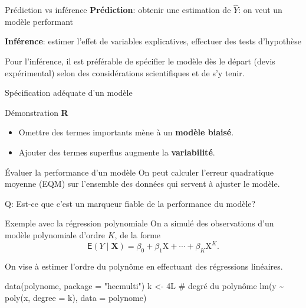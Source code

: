 \documentclass[
  ignorenonframetext,
]{beamer}
\newenvironment{Shaded}{\begin{snugshade}}{\end{snugshade}}
\newcommand{\AttributeTok}[1]{\textcolor[rgb]{0.40,0.45,0.13}{#1}}
\newcommand{\CommentTok}[1]{\textcolor[rgb]{0.37,0.37,0.37}{#1}}
\newcommand{\FunctionTok}[1]{\textcolor[rgb]{0.28,0.35,0.67}{#1}}
\newcommand{\NormalTok}[1]{\textcolor[rgb]{0.00,0.23,0.31}{#1}}
\newcommand{\OtherTok}[1]{\textcolor[rgb]{0.00,0.23,0.31}{#1}}
\newcommand{\SpecialCharTok}[1]{\textcolor[rgb]{0.37,0.37,0.37}{#1}}
\newcommand{\StringTok}[1]{\textcolor[rgb]{0.13,0.47,0.30}{#1}}
\providecommand{\tightlist}{%
  \setlength{\itemsep}{0pt}\setlength{\parskip}{0pt}}\usepackage{longtable,booktabs,array}
\begin{document}
\begin{frame}{Prédiction vs inférence}
\protect\hypertarget{pruxe9diction-vs-infuxe9rence}{}
\textbf{Prédiction}: obtenir une estimation de \(\widehat{Y}\): on veut
un modèle performant

\textbf{Inférence}: estimer l'effet de variables explicatives, effectuer
des tests d'hypothèse

Pour l'inférence, il est préférable de spécifier le modèle dès le départ
(devis expérimental) selon des considérations scientifiques et de s'y
tenir.
\end{frame}

\begin{frame}{Spécification adéquate d'un modèle}
\protect\hypertarget{spuxe9cification-aduxe9quate-dun-moduxe8le}{}
\begin{block}{Démonstration \textbf{R}}
\protect\hypertarget{duxe9monstration-r}{}
\begin{itemize}
\tightlist
\item
  Omettre des termes importants mène à un \textbf{modèle biaisé}.
\item
  Ajouter des termes superflus augmente la \textbf{variabilité}.
\end{itemize}
\end{block}
\end{frame}

\begin{frame}{Évaluer la performance d'un modèle}
\protect\hypertarget{uxe9valuer-la-performance-dun-moduxe8le}{}
On peut calculer l'erreur quadratique moyenne (EQM) sur l'ensemble des
données qui servent à ajuster le modèle.

Q: Est-ce que c'est un marqueur fiable de la performance du modèle?
\end{frame}

\begin{frame}[fragile]{Exemple avec la régression polynomiale}
\protect\hypertarget{exemple-avec-la-ruxe9gression-polynomiale}{}
On a simulé des observations d'un modèle polynomiale d'ordre \(K\), de
la forme
\[\mathsf{E}(Y \mid \mathbf{X}) = \beta_0 + \beta_1 \mathrm{X} + \cdots + \beta_K \mathrm{X}^K.\]

On vise à estimer l'ordre du polynôme en effectuant des régressions
linéaires.

\begin{Shaded}
\begin{Highlighting}[numbers=left,,]
\FunctionTok{data}\NormalTok{(polynome, }\AttributeTok{package =} \StringTok{"hecmulti"}\NormalTok{)}
\NormalTok{k }\OtherTok{\textless{}{-}}\NormalTok{ 4L }\CommentTok{\# degré du polynôme}
\FunctionTok{lm}\NormalTok{(y }\SpecialCharTok{\textasciitilde{}} \FunctionTok{poly}\NormalTok{(x, }\AttributeTok{degree =}\NormalTok{ k), }
   \AttributeTok{data =}\NormalTok{ polynome)}
\end{Highlighting}
\end{Shaded}
\end{frame}
\end{document}
